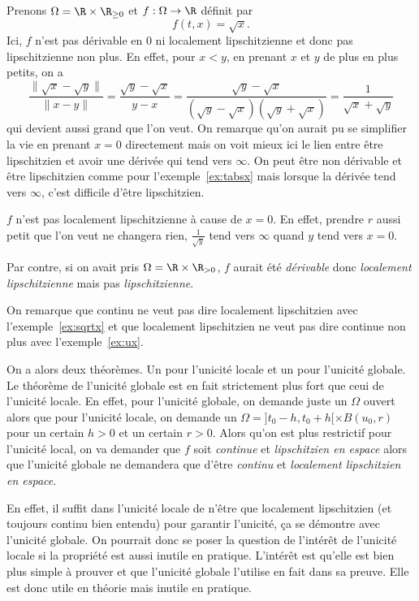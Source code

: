 \begin{myexem}
  \label{ex:sqrtx}
  Prenons $\Omega = \R\times\R_{\geq 0}$ et $f:\Omega\to\R$ définit par
  \[
    f(t,x) = \sqrt{x}.
  \]
  Ici, $f$ n'est pas dérivable en 0 ni localement lipschitzienne
  et donc pas lipschitzienne non plus.
  En effet, pour $x < y$, en prenant $x$ et $y$ de plus en plus petits,
  on a
  \[ \frac{\|\sqrt{x}-\sqrt{y}\|}{\|x-y\|} =
  \frac{\sqrt{y} - \sqrt{x}}{y-x} =
  \frac{\sqrt{y} - \sqrt{x}}{(\sqrt{y} - \sqrt{x})(\sqrt{y} + \sqrt{x})}
  = \frac{1}{\sqrt{x}+\sqrt{y}} \]
  qui devient aussi grand que l'on veut.
  On remarque qu'on aurait pu se simplifier la vie en prenant $x = 0$
  directement mais on voit mieux ici le lien entre être lipschitzien et avoir
  une dérivée qui tend vers $\infty$.
  On peut être non dérivable et être lipschitzien comme pour
  l'exemple~\ref{ex:tabsx} mais
  lorsque la dérivée tend vers $\infty$, c'est difficile d'être
  lipschitzien.

  $f$ n'est pas localement lipschitzienne à cause de $x=0$.
  En effet, prendre $r$ aussi petit que l'on veut ne changera rien,
  $\frac{1}{\sqrt{y}}$ tend vers $\infty$ quand $y$ tend vers $x = 0$.
  
  Par contre, si on avait pris $\Omega = \R \times \R_{>0}$, $f$
  aurait été \emph{dérivable} donc \emph{localement lipschitzienne} mais
  pas \emph{lipschitzienne}.
\end{myexem}
On remarque que continu ne veut pas dire localement lipschitzien avec
l'exemple~\ref{ex:sqrtx} et que localement lipschitzien ne veut pas
dire continue non plus avec l'exemple~\ref{ex:ux}.

On a alors deux théorèmes.
Un pour l'unicité locale et un pour l'unicité globale.
Le théorème de l'unicité globale est en fait strictement plus
fort que ceui de l'unicité locale.
En effet, pour l'unicité globale, on demande juste un $\Omega$ ouvert
alors que pour l'unicité locale, on demande un
$\Omega=]t_0-h,t_0+h[ \times B(u_0,r)$
pour un certain $h>0$ et un certain $r>0$.
Alors qu'on est plus restrictif pour l'unicité local,
on va demander que $f$ soit \emph{continue} et \emph{lipschitzien en espace}
alors que l'unicité globale ne demandera que d'être \emph{continu} et
\emph{localement lipschitzien en espace}.

En effet, il suffit dans l'unicité locale de n'être que localement
lipschitzien (et toujours continu bien entendu)
pour garantir l'unicité, ça se démontre avec l'unicité globale.
On pourrait donc se poser la question de l'intérêt de l'unicité
locale si la propriété est aussi inutile en pratique.
L'intérêt est qu'elle est bien plus simple à prouver et que l'unicité
globale l'utilise en fait dans sa preuve.
Elle est donc utile en théorie mais inutile en pratique.

